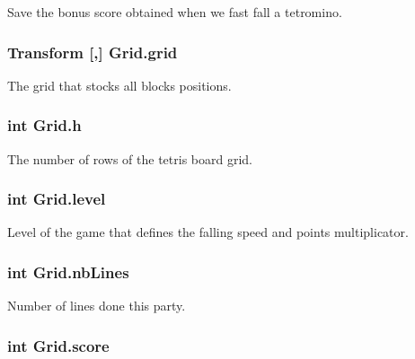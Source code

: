 Save the bonus score obtained when we fast fall a tetromino. 

\hypertarget{class_grid_a018870cf72623dd6c95a6b18f496e2fd}{
\subsubsection[{grid}]{\setlength{\rightskip}{0pt plus 5cm}Transform \mbox{[},\mbox{]} Grid.\-grid}}\label{class_grid_a018870cf72623dd6c95a6b18f496e2fd}


The grid that stocks all blocks positions. 

\hypertarget{class_grid_a639069cb7876f736d27f2bc37563f8fb}{
\subsubsection[{h}]{\setlength{\rightskip}{0pt plus 5cm}int Grid.\-h}}\label{class_grid_a639069cb7876f736d27f2bc37563f8fb}


The number of rows of the tetris board grid. 

\hypertarget{class_grid_aaecc1ecaff3fce790af5bb4c30e875cb}{
\subsubsection[{level}]{\setlength{\rightskip}{0pt plus 5cm}int Grid.\-level}}\label{class_grid_aaecc1ecaff3fce790af5bb4c30e875cb}


Level of the game that defines the falling speed and points multiplicator. 

\hypertarget{class_grid_a3c8ccfb19a0a98bc8b9614e680bf57cb}{
\subsubsection[{nb\-Lines}]{\setlength{\rightskip}{0pt plus 5cm}int Grid.\-nb\-Lines}}\label{class_grid_a3c8ccfb19a0a98bc8b9614e680bf57cb}


Number of lines done this party. 

\hypertarget{class_grid_abe3bc085c9b1b24a21eb7aae3d50ecf2}{
\subsubsection[{score}]{\setlength{\rightskip}{0pt plus 5cm}int Grid.\-score}}\label{class_grid_abe3bc085c9b1b24a21eb7aae3d50ecf2}


